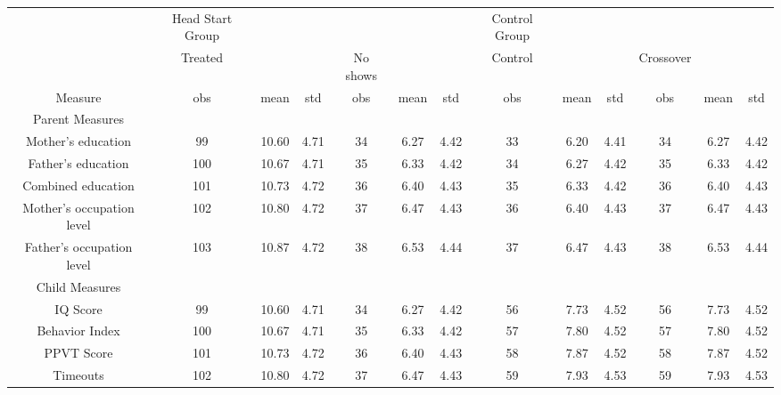 \begin{sidewaystable}[h]
\begin{center} \small
\begin{tabular}{ccccccccccccc}
\hline 

 & Head Start Group &  &  &  &  &  & Control Group &  &  &  &  &  \\

 & Treated &  &  & No shows &  &  & Control &  &  & Crossover &  &  \\

Measure & obs & mean & std & obs & mean & std & obs & mean & std & obs & mean & std \\

Parent Measures &  &  &  &  &  &  &  &  &  &  &  &  \\

Mother's education & 99 & 10.60 & 4.71 & 34 & 6.27 & 4.42 & 33 & 6.20 & 4.41 & 34 & 6.27 & 4.42 \\

Father's education & 100 & 10.67 & 4.71 & 35 & 6.33 & 4.42 & 34 & 6.27 & 4.42 & 35 & 6.33 & 4.42 \\

Combined education & 101 & 10.73 & 4.72 & 36 & 6.40 & 4.43 & 35 & 6.33 & 4.42 & 36 & 6.40 & 4.43 \\

Mother's occupation level & 102 & 10.80 & 4.72 & 37 & 6.47 & 4.43 & 36 & 6.40 & 4.43 & 37 & 6.47 & 4.43 \\

Father's occupation level & 103 & 10.87 & 4.72 & 38 & 6.53 & 4.44 & 37 & 6.47 & 4.43 & 38 & 6.53 & 4.44 \\

Child Measures &  &  &  &  &  &  &  &  &  &  &  &  \\

IQ Score & 99 & 10.60 & 4.71 & 34 & 6.27 & 4.42 & 56 & 7.73 & 4.52 & 56 & 7.73 & 4.52 \\

Behavior Index & 100 & 10.67 & 4.71 & 35 & 6.33 & 4.42 & 57 & 7.80 & 4.52 & 57 & 7.80 & 4.52 \\

PPVT Score & 101 & 10.73 & 4.72 & 36 & 6.40 & 4.43 & 58 & 7.87 & 4.52 & 58 & 7.87 & 4.52 \\

Timeouts & 102 & 10.80 & 4.72 & 37 & 6.47 & 4.43 & 59 & 7.93 & 4.53 & 59 & 7.93 & 4.53 \\

\hline 
\end{tabular}
\end{center}
\end{sidewaystable}